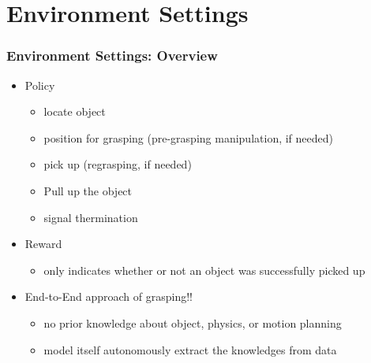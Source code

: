 \documentclass{beamer}
\newcommand{\fifthSec}{Environment Settings}
\begin{document}
  \section{\fifthSec}
    \begin{frame}
      \frametitle{\fifthSec : Overview}
      \begin{itemize}
        \item Policy
        \begin{itemize}
          \item locate object
          \item position for grasping (pre-grasping manipulation, if needed)
          \item pick up (regrasping, if needed)
          \item Pull up the object
          \item signal thermination
        \end{itemize}
        \item Reward
        \begin{itemize}
          \item only indicates whether or not an object was successfully picked up
        \end{itemize}
        \item End-to-End approach of grasping!!
        \begin{itemize}
          \item no prior knowledge about object, physics, or motion planning
          \item model itself autonomously extract the knowledges from data
        \end{itemize}
      \end{itemize}
    \end{frame}
\end{document}
